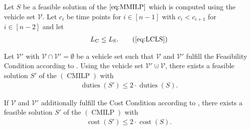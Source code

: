 \begin{theorem}
\label{thm:doubleduties}

Let $S$ be a feasible solution of the $\eqref{eq:MMILP}$ which is computed using the vehicle set $\mathcal{V}$. Let $c_i$ be time points for $i\in[n-1]$ with ${c_i<c_{i+1}}$ for ${i\in[n-2]}$ and let
\begin{align}
	L_{\operatorname{C}} \leq L_{\operatorname{S}}. \tag{\ref{eq:LCLS}}
\end{align}

Let $\mathcal{V}'$ with ${\mathcal{V}\cap\mathcal{V}'=\emptyset}$ be a vehicle set such that $\mathcal{V}$ and $\mathcal{V}'$ fulfill the Feasibility Condition according to . Using the vehicle set $\mathcal{V}'\cupdot\mathcal{V}$, there exists a feasible solution $S'$ of the $(\operatorname{CMILP})$ with
\begin{align}
	\operatorname{duties}\left(S'\right) \leq 2\cdot\operatorname{duties}\left(S\right).
\end{align}

If $\mathcal{V}$ and $\mathcal{V}'$ additionally fulfill the Cost Condition according to , there exists a feasible solution $S'$ of the $(\operatorname{CMILP})$ with
\begin{align}
	\operatorname{cost}\left(S'\right) \leq 2\cdot\operatorname{cost}\left(S\right).
\end{align}

\end{theorem}


